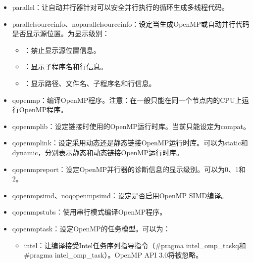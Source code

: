 \documentclass[a4paper,12pt,english]{sphinxmanual}
\begin{document}
\begin{itemize}
\item {} 
\sphinxAtStartPar
\sphinxhyphen{}parallel：让自动并行器针对可以安全并行执行的循环生成多线程代码。

\item {} 
\sphinxAtStartPar
\sphinxhyphen{}parallel\sphinxhyphen{}source\sphinxhyphen{}info、\sphinxhyphen{}no\sphinxhyphen{}parallel\sphinxhyphen{}source\sphinxhyphen{}info：设定当生成OpenMP或自动并行代码是否显示源位置。为显示级别：
\begin{itemize}
\item {} 
：禁止显示源位置信息。

\item {} 
：显示子程序名和行信息。

\item {} 
：显示路径、文件名、子程序名和行信息。

\end{itemize}

\item {} 
\sphinxAtStartPar
\sphinxhyphen{}qopenmp：编译OpenMP程序。注意：在一般只能在同一个节点内的CPU上运行OpenMP程序。

\item {} 
\sphinxAtStartPar
\sphinxhyphen{}qopenmp\sphinxhyphen{}lib：设定链接时使用的OpenMP运行时库。当前只能设定为compat。

\item {} 
\sphinxAtStartPar
\sphinxhyphen{}qopenmp\sphinxhyphen{}link：设定采用动态还是静态链接OpenMP运行时库。可以为static和dynamic，分别表示静态和动态链接OpenMP运行时库。

\item {} 
\sphinxAtStartPar
\sphinxhyphen{}qopenmp\sphinxhyphen{}report：设定OpenMP并行器的诊断信息的显示级别。可以为0、1和2。

\item {} 
\sphinxAtStartPar
\sphinxhyphen{}qopenmp\sphinxhyphen{}simd、\sphinxhyphen{}no\sphinxhyphen{}qopenmp\sphinxhyphen{}simd：设定是否启用OpenMP SIMD编译。

\item {} 
\sphinxAtStartPar
\sphinxhyphen{}qopenmp\sphinxhyphen{}stubs：使用串行模式编译OpenMP程序。

\item {} 
\sphinxAtStartPar
\sphinxhyphen{}qopenmp\sphinxhyphen{}task：设定OpenMP的任务模型。可以为：
\begin{itemize}
\item {} 
\sphinxAtStartPar
intel：让编译接受Intel任务序列指导指令（\#pragma intel\_omp\_taskq和\#pragma intel\_omp\_task）。OpenMP API 3.0将被忽略。


\end{itemize}
\end{itemize}
\end{document}
